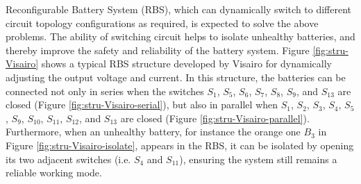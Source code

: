 \documentclass{article}
\begin{document}
Reconfigurable Battery System (RBS), which can dynamically switch to different circuit topology configurations as required, is expected to solve the above problems\cite{hanNextGenerationBatteryManagement2020a}.
The ability of switching circuit helps to isolate unhealthy batteries, and thereby improve the safety and reliability of the battery system.
Figure \ref{fig:stru-Visairo} shows a typical RBS structure developed by Visairo \cite{visairoReconfigurableBatteryPack2008} for dynamically adjusting the output voltage and current.
In this structure, the batteries can be connected not only in series when the switches $S_1$, $S_5$, $S_6$, $S_7$, $S_8$, $S_9$, and $S_{13}$ are closed (Figure \ref{fig:stru-Visairo-serial}), but also in parallel when $S_1$, $S_2$, $S_3$, $S_4$, $S_5$, $S_9$, $S_{10}$, $S_{11}$, $S_{12}$, and $S_{13}$ are closed (Figure \ref{fig:stru-Visairo-parallel}).
Furthermore, when an unhealthy battery, for instance the orange one $B_3$ in Figure \ref{fig:stru-Visairo-isolate}, appears in the RBS, it can be isolated by opening its two adjacent switches (i.e. $S_4$ and $S_{11}$), ensuring the system still remains a reliable working mode.
\end{document}
